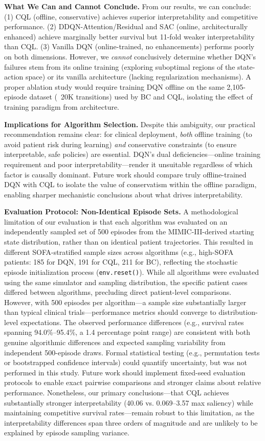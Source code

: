 \textbf{What We Can and Cannot Conclude.} From our results, we can conclude: (1) CQL (offline, conservative) achieves superior interpretability and competitive performance. (2) DDQN-Attention/Residual and SAC (online, architecturally enhanced) achieve marginally better survival but 11-fold weaker interpretability than CQL. (3) Vanilla DQN (online-trained, no enhancements) performs poorly on both dimensions. However, we \textit{cannot} conclusively determine whether DQN's failures stem from its online training (exploring suboptimal regions of the state-action space) or its vanilla architecture (lacking regularization mechanisms). A proper ablation study would require training DQN offline on the same 2,105-episode dataset (~20K transitions) used by BC and CQL, isolating the effect of training paradigm from architecture.

\textbf{Implications for Algorithm Selection.} Despite this ambiguity, our practical recommendation remains clear: for clinical deployment, \textit{both} offline training (to avoid patient risk during learning) \textit{and} conservative constraints (to ensure interpretable, safe policies) are essential. DQN's dual deficiencies—online training requirement and poor interpretability—render it unsuitable regardless of which factor is causally dominant. Future work should compare truly offline-trained DQN with CQL to isolate the value of conservatism within the offline paradigm, enabling sharper mechanistic conclusions about what drives interpretability.

\textbf{Evaluation Protocol: Non-Identical Episode Sets.} A methodological limitation of our evaluation is that each algorithm was evaluated on an independently sampled set of 500 episodes from the MIMIC-III-derived starting state distribution, rather than on identical patient trajectories. This resulted in different SOFA-stratified sample sizes across algorithms (e.g., high-SOFA patients: 185 for DQN, 191 for CQL, 211 for BC), reflecting the stochastic episode initialization process (\texttt{env.reset()}). While all algorithms were evaluated using the same simulator and sampling distribution, the specific patient cases differed between algorithms, precluding direct patient-level comparisons. However, with 500 episodes per algorithm—a sample size substantially larger than typical clinical trials—performance metrics should converge to distribution-level expectations. The observed performance differences (e.g., survival rates spanning 94.0\%--95.4\%, a 1.4 percentage point range) are consistent with both genuine algorithmic differences and expected sampling variability from independent 500-episode draws. Formal statistical testing (e.g., permutation tests or bootstrapped confidence intervals) could quantify uncertainty, but was not performed in this study. Future work should implement fixed-seed evaluation protocols to enable exact pairwise comparisons and stronger claims about relative performance. Nonetheless, our primary conclusions—that CQL achieves substantially stronger interpretability (40.06 vs. 0.069--3.57 max saliency) while maintaining competitive survival rates—remain robust to this limitation, as the interpretability differences span three orders of magnitude and are unlikely to be explained by episode sampling variance.

